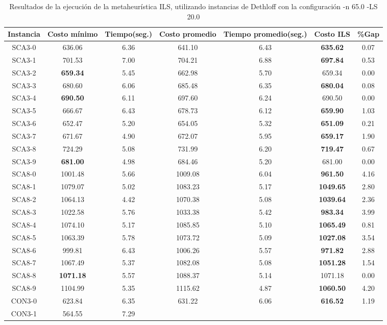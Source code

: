 \begin{table}[ht]
\caption{Resultados de la ejecución de la metaheurística ILS, utilizando instancias de Dethloff con la configuración -n 65.0 -LS 20.0}
\centering
\small
\begin{tabular}{c c c c c c c}
\hline\hline
Instancia & Costo mínimo & Tiempo(seg.) & Costo promedio & Tiempo promedio(seg.) & Costo ILS & \%Gap \\ [0.5ex]
\hline
SCA3-0 & 636.06 & 6.36 & 
641.10 & 6.43 & \bf{635.62} & 
0.07\\SCA3-1 & 701.53 & 7.00 & 
704.21 & 6.88 & \bf{697.84} & 
0.53\\SCA3-2 & \bf{659.34} & 5.45 & 
662.98 & 5.70 & 659.34 & 0.00\\
SCA3-3 & 680.60 & 6.06 & 
685.48 & 6.35 & \bf{680.04} & 
0.08\\SCA3-4 & \bf{690.50} & 6.11 & 
697.60 & 6.24 & 690.50 & 0.00\\
SCA3-5 & 666.67 & 6.43 & 
678.73 & 6.12 & \bf{659.90} & 
1.03\\SCA3-6 & 652.47 & 5.20 & 
654.05 & 5.32 & \bf{651.09} & 
0.21\\SCA3-7 & 671.67 & 4.90 & 
672.07 & 5.95 & \bf{659.17} & 
1.90\\SCA3-8 & 724.29 & 5.08 & 
731.99 & 6.20 & \bf{719.47} & 
0.67\\SCA3-9 & \bf{681.00} & 4.98 & 
684.46 & 5.20 & 681.00 & 0.00\\
SCA8-0 & 1001.48 & 5.66 & 
1009.08 & 6.04 & \bf{961.50} & 
4.16\\SCA8-1 & 1079.07 & 5.02 & 
1083.23 & 5.17 & \bf{1049.65} & 
2.80\\SCA8-2 & 1064.13 & 4.42 & 
1070.38 & 5.08 & \bf{1039.64} & 
2.36\\SCA8-3 & 1022.58 & 5.76 & 
1033.38 & 5.42 & \bf{983.34} & 
3.99\\SCA8-4 & 1074.10 & 5.17 & 
1085.85 & 5.10 & \bf{1065.49} & 
0.81\\SCA8-5 & 1063.39 & 5.78 & 
1073.72 & 5.09 & \bf{1027.08} & 
3.54\\SCA8-6 & 999.81 & 6.43 & 
1006.26 & 5.57 & \bf{971.82} & 
2.88\\SCA8-7 & 1067.49 & 5.37 & 
1082.08 & 5.08 & \bf{1051.28} & 
1.54\\SCA8-8 & \bf{1071.18} & 5.57 & 
1088.37 & 5.14 & 1071.18 & 0.00\\
SCA8-9 & 1104.99 & 5.35 & 
1115.62 & 4.87 & \bf{1060.50} & 
4.20\\CON3-0 & 623.84 & 6.35 & 
631.22 & 6.06 & \bf{616.52} & 
1.19\\CON3-1 & 564.55 & 7.29 & 

\end{tabular}
\end{table}
